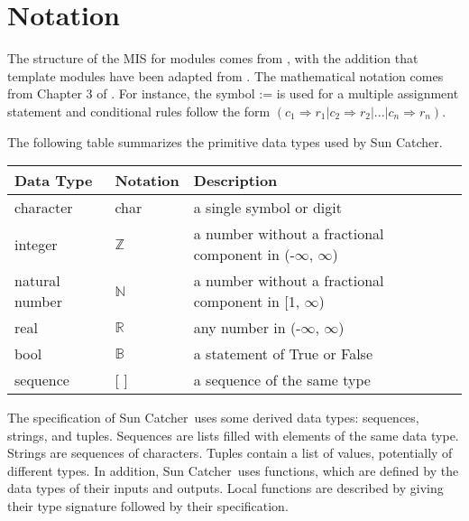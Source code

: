\documentclass[12pt, titlepage]{article}
\newcommand{\progname}{Sun Catcher}
\begin{document}
\section{Notation}


The structure of the MIS for modules comes from \citet{HoffmanAndStrooper1995},
with the addition that template modules have been adapted from
\cite{GhezziEtAl2003}.  The mathematical notation comes from Chapter 3 of
\citet{HoffmanAndStrooper1995}.  For instance, the symbol := is used for a
multiple assignment statement and conditional rules follow the form $(c_1
\Rightarrow r_1 | c_2 \Rightarrow r_2 | ... | c_n \Rightarrow r_n )$.

The following table summarizes the primitive data types used by \progname. 

\begin{center}
\renewcommand{\arraystretch}{1.2}
\noindent 
\begin{tabular}{l l p{7.5cm}} 
\toprule 
\textbf{Data Type} & \textbf{Notation} & \textbf{Description}\\ 
\midrule
character & char & a single symbol or digit\\
integer & $\mathbb{Z}$ & a number without a fractional component in  (-$\infty$,
$\infty$) \\
natural number & $\mathbb{N}$ & a number without a fractional component in [1,
$\infty$) \\
real & $\mathbb{R}$ & any number in  (-$\infty$, $\infty$)\\
bool &$\mathbb{B}$ & a statement of True or False\\
sequence & [ ] & a sequence of the same type\\


\bottomrule
\end{tabular} 
\end{center}

\noindent
The specification of \progname \ uses some derived data types: sequences,
strings, and
tuples. Sequences are lists filled with elements of the same data type. Strings
are sequences of characters. Tuples contain a list of values, potentially of
different types. In addition, \progname \ uses functions, which
are defined by the data types of their inputs and outputs. Local functions are
described by giving their type signature followed by their specification.
\end{document}
